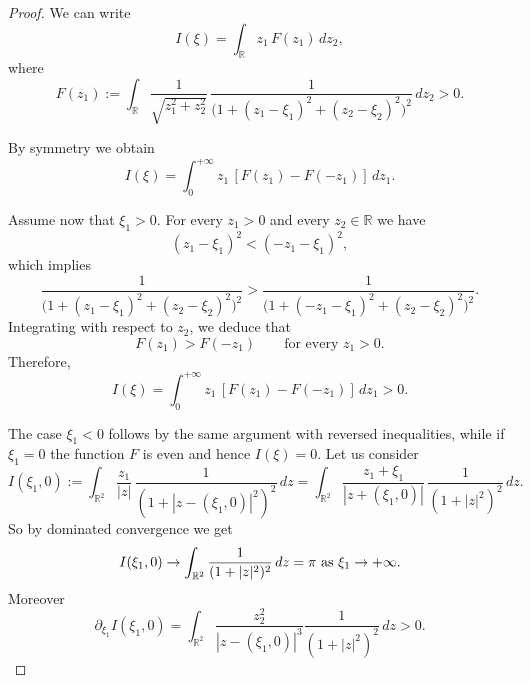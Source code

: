 \documentclass[10pt,a4paper]{amsart}
\newcommand{\R}{\mathbb{R}}
\newcommand{\intr}{\int_{\R^2}}
\begin{document}
\begin{proof}
We can write
$$
I(\xi)=\int_{\R} z_1\, F(z_1)\,dz_2,
$$
where
$$
F(z_1):=\int_{\R}
\frac{1}{\sqrt{z_1^2+z_2^2}}\,
\frac{1}{\bigl(1+(z_1-\xi_1)^2+(z_2-\xi_2)^2\bigr)^2}
\,dz_2 >0.
$$

By symmetry  we obtain
$$
I(\xi)=\int_0^{+\infty} z_1\,[F(z_1)-F(-z_1)]\,dz_1.
$$

Assume now that $\xi_1>0$. For every $z_1>0$ and every $z_2\in\R$ we have
$$
(z_1-\xi_1)^2<(-z_1-\xi_1)^2,
$$
which implies
$$
\frac{1}{\bigl(1+(z_1-\xi_1)^2+(z_2-\xi_2)^2\bigr)^2}
>
\frac{1}{\bigl(1+(-z_1-\xi_1)^2+(z_2-\xi_2)^2\bigr)^2}.
$$
Integrating with respect to $z_2$, we deduce that
$$
F(z_1)>F(-z_1)
\qquad \text{for every } z_1>0.
$$
Therefore,
$$
I(\xi)=\int_0^{+\infty} z_1\,[F(z_1)-F(-z_1)]\,dz_1>0.
$$

  The case $\xi_1<0$ follows by the same argument with reversed inequalities,
while if $\xi_1=0$ the function $F$ is even and hence $I(\xi)=0$.
Let us consider
$$
I(\xi_1,0):=\int_{\R^2}\frac{z_1}{|z|}\,\frac{1}{(1+|z-(\xi_1,0)|^2)^2}\,dz=\int_{\R^2}\frac{z_1+\xi_1}{|z+(\xi_1,0)|}\,\frac{1}{(1+|z|^2)^2}\,dz .
$$ So by dominated convergence we get $$I(\xi_1,0)\to \intr \frac{1}{(1+|z|^2)^2}\,dz=\pi \hbox{ as }\xi_1\to +\infty.$$ Moreover 
$$\partial_{\xi_1} I(\xi_1,0)= \intr\frac{z_2^2}{|z-(\xi_1,0)|^3}\frac{1}{(1+|z|^2)^2}\,dz>0.$$
\end{proof}
\end{document}
